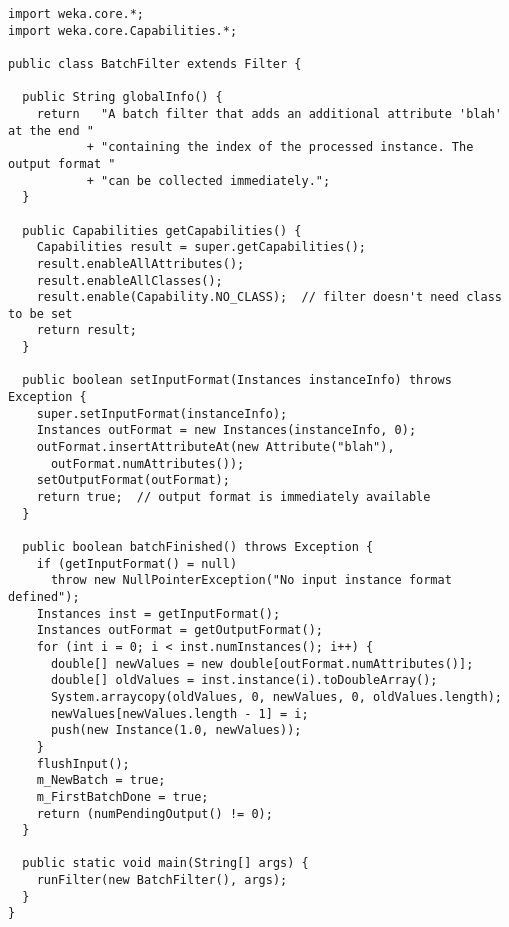
\begin{verbatim}
import weka.core.*;
import weka.core.Capabilities.*;

public class BatchFilter extends Filter {

  public String globalInfo() {
    return   "A batch filter that adds an additional attribute 'blah' at the end "
           + "containing the index of the processed instance. The output format "
           + "can be collected immediately.";
  }

  public Capabilities getCapabilities() {
    Capabilities result = super.getCapabilities();
    result.enableAllAttributes();
    result.enableAllClasses();
    result.enable(Capability.NO_CLASS);  // filter doesn't need class to be set
    return result;
  }

  public boolean setInputFormat(Instances instanceInfo) throws Exception {
    super.setInputFormat(instanceInfo);
    Instances outFormat = new Instances(instanceInfo, 0);
    outFormat.insertAttributeAt(new Attribute("blah"),
	  outFormat.numAttributes());
    setOutputFormat(outFormat);
    return true;  // output format is immediately available
  }

  public boolean batchFinished() throws Exception {
    if (getInputFormat() = null)
      throw new NullPointerException("No input instance format defined");
    Instances inst = getInputFormat();
    Instances outFormat = getOutputFormat();
    for (int i = 0; i < inst.numInstances(); i++) {
      double[] newValues = new double[outFormat.numAttributes()];
      double[] oldValues = inst.instance(i).toDoubleArray();
      System.arraycopy(oldValues, 0, newValues, 0, oldValues.length);
      newValues[newValues.length - 1] = i;
      push(new Instance(1.0, newValues));
    }
    flushInput();
    m_NewBatch = true;
    m_FirstBatchDone = true;
    return (numPendingOutput() != 0);
  }

  public static void main(String[] args) {
    runFilter(new BatchFilter(), args);
  }
}
\end{verbatim}
